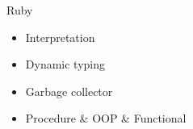 \begin{frame}{Ruby}
  \begin{center}
    \begin{itemize}
      \item Interpretation
      \item Dynamic typing
      \item Garbage collector
      \item Procedure \& OOP \& Functional
    \end{itemize}
  \end{center}
\end{frame}